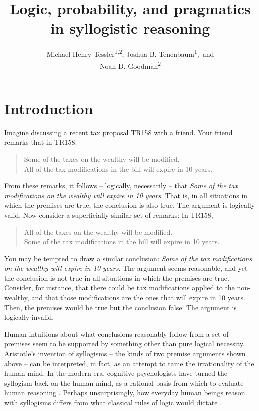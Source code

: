 \documentclass[floatsintext, doc]{apa6}
\title{Logic, probability, and pragmatics in syllogistic reasoning}
\author{Michael Henry Tessler\textsuperscript{1}\textsuperscript{,2}, Joshua B. Tenenbaum\textsuperscript{1},~and \\Noah D. Goodman\textsuperscript{2}}
\date{}
\affiliation{
\vspace{0.5cm}
\textsuperscript{1} Department of Brain and Cognitive Sciences, Massachusetts Institute of Technology \\
\textsuperscript{2} Department of Psychology, Stanford University
}
\date{}
\begin{document}
\maketitle



\newpage

\section{Introduction}

Imagine discussing a recent tax proposal TR158 with a friend. Your friend remarks that in TR158:

\begin{quote}
Some of the taxes on the wealthy will be modified. \\
All of the tax modifications in the bill will expire in 10 years.
\end{quote}

From these remarks, it follows -- logically, necessarily -- that \emph{Some of the tax modifications on the wealthy will expire in 10 years}.
That is, in all situations in which the premises are true, the conclusion is also true. 
The argument is logically valid.
Now consider a superficially similar set of remarks: In TR158,

\begin{quote}
All of the taxes on the wealthy will be modified. \\
Some of the tax modifications in the bill will expire in 10 years.
\end{quote}

You may be tempted to draw a similar conclusion:  \emph{Some of the tax modifications on the wealthy will expire in 10 years}.
The argument seems reasonable, and yet the conclusion is not true in all situations in which the premises are true.
Consider, for instance, that there could be tax modifications applied to the non-wealthy, and that those modifications are the ones that will expire in 10 years.
Then, the premises would be true but the conclusion false: The argument is logically invalid.

Human intuitions about what conclusions reasonably follow from a set of premises seem to be supported by something other than pure logical necessity. 
Aristotle's invention of syllogisms -- the kinds of two premise arguments shown above -- can be interpreted, in fact, as an attempt to tame the irrationality of the human mind.
In the modern era, cognitive psychologists have turned the syllogism back on the human mind, as a rational basis from which to evaluate human reasoning \cite{Storring1908}.
Perhaps unsurprisingly, how everyday human beings reason with syllogisms differs from what classical rules of logic would dictate \cite<for a meta-analysis, see:>{Khemlani2012}.
\end{document}
